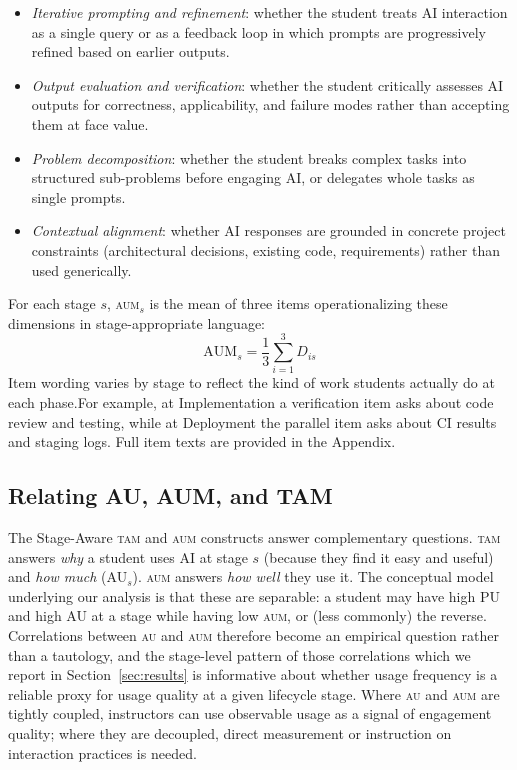 \documentclass[sigconf,anonymous]{acmart}
\newcommand{\AUM}{\textsc{aum}\xspace}
\newcommand{\AU}{\textsc{au}\xspace}
\newcommand{\TAM}{\textsc{tam}\xspace}
\begin{document}
\begin{itemize}[noitemsep,topsep=2pt,leftmargin=*]
  \item \emph{Iterative prompting and refinement}: whether the student
    treats AI interaction as a single query or as a feedback loop in
    which prompts are progressively refined based on earlier outputs.
  \item \emph{Output evaluation and verification}: whether the student
    critically assesses AI outputs for correctness, applicability,
    and failure modes rather than accepting them at face value.
  \item \emph{Problem decomposition}: whether the student breaks
    complex tasks into structured sub-problems before engaging AI, or
    delegates whole tasks as single prompts.
  \item \emph{Contextual alignment}: whether AI responses are grounded
    in concrete project constraints (architectural decisions, existing
    code, requirements) rather than used generically.
\end{itemize}

For each stage $s$, \AUM$_s$ is the mean of three items
operationalizing these dimensions in stage-appropriate language:
\[
  \text{AUM}_s = \frac{1}{3} \sum_{i=1}^{3} D_{is}
\]
Item wording varies by stage to reflect the kind of work students
actually do at each phase.For example, at Implementation a
verification item asks about code review and testing, while at
Deployment the parallel item asks about CI results and staging logs.
Full item texts are provided in the Appendix.

\subsection{Relating AU, AUM, and TAM}
The Stage-Aware \TAM and \AUM constructs answer complementary
questions. \TAM answers \emph{why} a student uses AI at stage $s$
(because they find it easy and useful) and \emph{how much}
(AU$_s$). \AUM answers \emph{how well} they use it. The conceptual
model underlying our analysis is that these are separable: a student
may have high PU and high AU at a stage while having low \AUM, or
(less commonly) the reverse. Correlations between \AU and \AUM
therefore become an empirical question rather than a tautology, and
the stage-level pattern of those correlations which we report in
Section~\ref{sec:results} is informative about whether usage
frequency is a reliable proxy for usage quality at a given lifecycle
stage. Where \AU and \AUM are tightly coupled, instructors can use
observable usage as a signal of engagement quality; where they are
decoupled, direct measurement or instruction on interaction practices
is needed.
\end{document}
